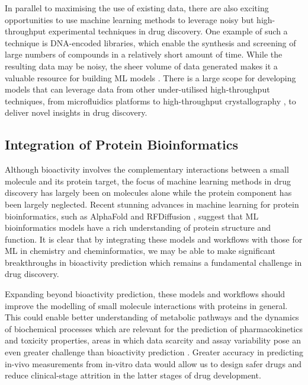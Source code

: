 In parallel to maximising the use of existing data, there are also exciting opportunities to use machine learning methods to leverage noisy but high-throughput experimental techniques in drug discovery. One example of such a technique is DNA-encoded libraries, which enable the synthesis and screening of large numbers of compounds in a relatively short amount of time. While the resulting data may be noisy, the sheer volume of data generated makes it a valuable resource for building ML models \cite{McCloskey2020DNALibrary, Blay20221DELTox, Lim2022DELCountML}. There is a large scope for developing models that can leverage data from other under-utilised high-throughput techniques, from microfluidics platforms \cite{Dittrich2006microfluidics, Skardal2016chip} to high-throughput crystallography \cite{Blundell2002HighThroughputCrystallography, Schiebel2016HighThroughput}, to deliver novel insights in drug discovery.

\subsection{Integration of Protein Bioinformatics}
Although bioactivity involves the complementary interactions between a small molecule and its protein target, the focus of machine learning methods in drug discovery has largely been on molecules alone while the protein component has been largely neglected. Recent stunning advances in machine learning for protein bioinformatics, such as AlphaFold \cite{Jumper2021AlphaFold} and RFDiffusion \cite{Watson2022RfDiffusion}, suggest that ML bioinformatics models have a rich understanding of protein structure and function. It is clear that by integrating these models and workflows with those for ML in chemistry and cheminformatics, we may be able to make significant breakthroughs in bioactivity prediction which remains a fundamental challenge in drug discovery.

Expanding beyond bioactivity prediction, these models and workflows should improve the modelling of small molecule interactions with proteins in general. This could enable better understanding of metabolic pathways and the dynamics of biochemical processes which are relevant for the prediction of pharmacokinetics and toxicity properties, areas in which data scarcity and assay variability pose an even greater challenge than bioactivity prediction \cite{Bhhatarai2019ADMETox, Wenzel2019ADMETox, Goller2020BayerADMET, Obrezanova2022InVivo}. Greater accuracy in predicting in-vivo measurements from in-vitro data would allow us to design safer drugs and reduce clinical-stage attrition in the latter stages of drug development.

